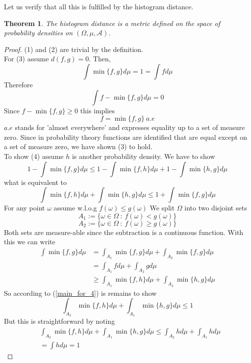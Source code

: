 \documentclass[17pt]{extarticle}
\newtheorem*{theorem*}{Theorem}
\begin{document}
Let us verify that all this is fulfilled by the histogram distance.
\begin{theorem*}
	The histogram distance is a metric defined on the space of probability densities on $(\Omega, \mu, \mathcal{A})$.
\end{theorem*}
\begin{proof}
	(1) and (2) are trivial by the definition.\\
	For (3) assume $d(f,g)=0$. Then,
	$$\int \min\{f,g\}d\mu = 1=\int f d\mu$$
	Therefore
	$$\int f-\min\{f,g\}d\mu=0$$
	Since $f-\min\{f,g\}\geq 0$ this implies
	$$f=\min\{f,g\} \ a.e$$
	$a.e$ stands for 'almost everywhere' and expresses equality up to a set of measure zero.
	Since in probability theory functions are identified that are equal except on a set of measure zero,
	we have shown (3) to hold.\\
	To show (4) assume $h$ is another probability density. We have to show
	$$1-\int\min\{f,g\}d\mu\leq 1-\int\min\{f,h\}d\mu + 1-\int\min\{h,g\}d\mu$$
	what is equivalent to
	\begin{equation} \label{main_for_4}
		\int\min\{f,h\}d\mu + \int\min\{h,g\}d\mu\leq 1+\int\min\{f,g\}d\mu
	\end{equation}
	For any point $\omega$ assume w.l.o.g $f(\omega)\leq g(\omega)$
	We split $\Omega$ into two disjoint sets
	$$A_1:=\{\omega\in\Omega \ : \ f(\omega) < g(\omega)\}$$
	$$A_2:=\{\omega\in\Omega \ : \ f(\omega) \geq  g(\omega)\}$$
	Both sets are measure-able since the subtraction is a continuous function.
	With this we can write
	\begin{align*}
	\int\min\{f,g\}d\mu&=\int_{A_1}\min\{f,g\}d\mu+\int_{A_2}\min\{f,g\}d\mu\\
	&=\int_{A_1}f d\mu+\int_{A_2}g d\mu\\
	&\geq \int_{A_1}\min\{f,h\}d\mu + \int_{A_2}\min\{h,g\}d\mu
	\end{align*}
	So according to (\ref{main_for_4}) is remains to show
	$$\int_{A_2}\min\{f,h\}d\mu + \int_{A_1}\min\{h,g\}d\mu\leq 1$$
    But this is straightforward by noting
    \begin{align*}
    	&\int_{A_2}\min\{f,h\}d\mu + \int_{A_1}\min\{h,g\}d\mu\leq \int_{A_2}h d\mu + \int_{A_1}h d\mu\\
    	&=\int h d\mu=1
    \end{align*}
    
\end{proof}
\end{document}
